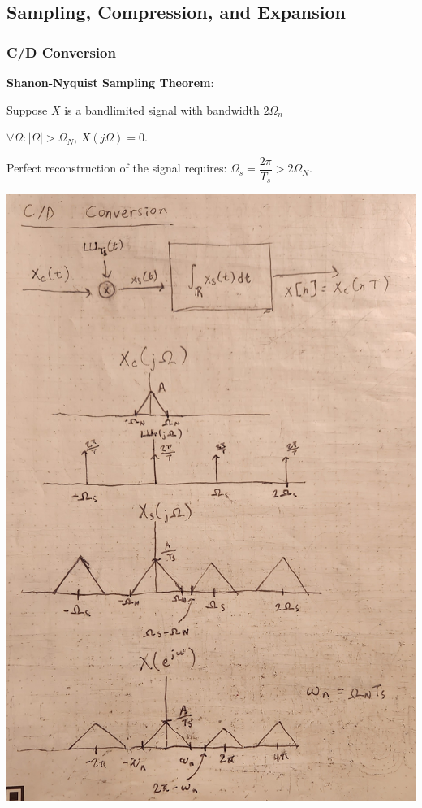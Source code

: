 \documentclass[11pt]{article}
\begin{document}
  \pagebreak

  \subsection{Sampling, Compression, and Expansion}

  \subsubsection{C/D Conversion}

  \small\textbf{Shanon-Nyquist Sampling Theorem}:

  Suppose \(X\) is a bandlimited signal with bandwidth \(2\Omega_n\)

  \(\forall \Omega : |\Omega| > \Omega_N\), \(X(j\Omega) = 0\).

  Perfect reconstruction of the signal requires:
  \(\Omega_s = \dfrac{2\pi}{T_s} > 2\Omega_N\).

  \includegraphics[scale=0.165]{graphics/cd_conversion.jpg}
\end{document}
